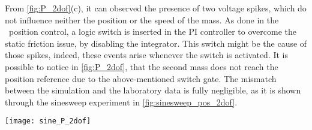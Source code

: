 From \cref{fig:P_2dof}(c), it can observed the presence of two voltage spikes, which do not influence neither the position or the speed of the mass. As done in the \onedof\ position control, a logic switch is inserted in the PI controller to overcome the static friction issue, by disabling the integrator. This switch might be the cause of those spikes, indeed, these events arise whenever the switch is activated. 
It is possible to notice in \cref{fig:P_2dof}, that the second mass does not reach the position reference due to the above-mentioned switch gate.
The mismatch between the simulation and the laboratory data is fully negligible, as it is shown through the sinesweep experiment in \cref{fig:sinesweep_pos_2dof}.
\begin{figure*}[h]
	\centering
	\texttt{[image: sine\_P\_2dof]}
	\caption{Sineweep experiment from $0.1\ Hz$ to $1\ Hz$ in $100\ s$}
	\label{fig:sinesweep_pos_2dof}
\end{figure*}